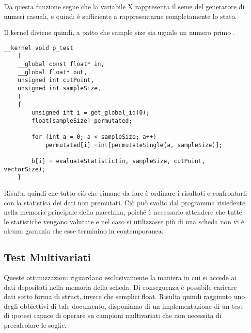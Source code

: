 Da questa funzione segue che la variabile X rappresenta il seme del generatore di numeri casuali, e quindi è sufficiente a rappresentarne completamente lo stato. 

Il kernel diviene quindi, a patto che sample size sia uguale un numero primo .
\begin{lstlisting}[style=CStyle]
	__kernel void p_test
	(
	__global const float* in,
	__global float* out,
	unsigned int cutPoint,
	unsigned int sampleSize,
	)
	{
		unsigned int i = get_global_id(0);
		float[sampleSize] permutated;
		
		for (int a = 0; a < sampleSize; a++)
			permutated[i] =int[permutateSingle(a, sampleSize)];
		
		b[i] = evaluateStatistic(in, sampleSize, cutPoint, vectorSize);
	}
\end{lstlisting}

Risulta quindi che tutto ciò che rimane da fare è ordinare i risultati e confrontarli con la statistica dei dati non premutati. Ciò può svolto dal programma risiedente nella memoria principale della macchina, poiché è necessario attendere che tutte le statistiche vengano valutate e nel caso si utilizzasse più di una scheda non vi è alcuna garanzia che esse terminino in contemporanea. 


\subsection{Test Multivariati}
Queste ottimizzazioni riguardano esclusivamente la maniera in cui si accede ai dati depositati nella memoria della scheda. Di conseguenza è possibile caricare dati sotto forma di struct, invece che semplici float. Risulta quindi raggiunto uno degli obbiettivi di tale documento, disponiamo di un implementazione di un test di ipotesi capace di operare su campioni multivariati che non necessita di precalcolare le soglie.